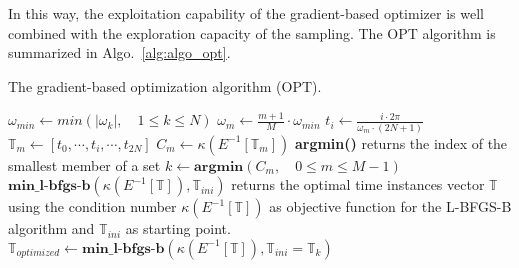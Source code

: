 In this way, the exploitation capability of the gradient-based
optimizer is well combined with the exploration capacity of the
sampling. The OPT algorithm is summarized in Algo.~\ref{alg:algo_opt}.
\begin{algorithm}
\caption{The gradient-based optimization algorithm (OPT).}
\label{alg:algo_opt}
\begin{algorithmic}
\STATE $\omega_{min} \leftarrow min \left( |\omega_k |,\quad 1 \leqslant k \leqslant N \right)$
    \STATE $\omega_m \leftarrow \frac{m + 1}{M} \cdot \omega_{min}$
        \STATE $t_i \leftarrow \displaystyle\frac{i \cdot 2 \pi}{\omega_m \cdot (2N + 1)}$
    \ENDFOR
    \STATE $\mathbb{T}_m \leftarrow [t_0, \cdots, t_i, \cdots, t_{2N}]$
    \STATE $C_m \leftarrow \kappa \left(E^{-1} \left[\mathbb{T}_m \right] \right)$
\ENDFOR
\STATE \textbf{argmin()} returns the index of the smallest member of a set
\STATE $k \leftarrow \textbf{argmin}\left(C_m,\quad 0\leqslant m \leqslant M-1\right)$
\STATE $\textbf{min\_l-bfgs-b}\left(\kappa \left(E^{-1} \left[\mathbb{T}\right]\right), \mathbb{T}_{ini}\right)$ returns the optimal 
time instances vector $\mathbb{T}$ using the condition number $\kappa\left(E^{-1} \left[\mathbb{T}\right]\right)$ as objective function 
for the L-BFGS-B algorithm and  $\mathbb{T}_{ini}$ as starting point.
\STATE $\mathbb{T}_{optimized} \leftarrow 
  \textbf{min\_l-bfgs-b}\left(\kappa\left(E^{-1} \left[\mathbb{T}\right]\right), \mathbb{T}_{ini}=\mathbb{T}_k\right)$
\end{algorithmic}
\end{algorithm}

